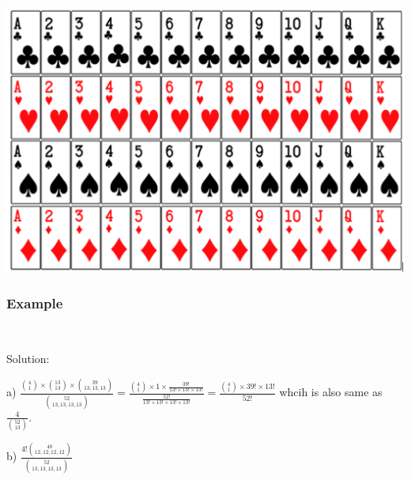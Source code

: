 \documentclass[compress]{beamer}
\begin{document}
\begin{frame}
\begin{center}
\includegraphics[scale=.4]{figs/Cards.png}
\end{center}
\end{frame}



\begin{frame}\frametitle{Example}
\\
\pause
\vspace{1in}
{\tiny 
Solution: 

a) $ \frac{   {4 \choose 1}\times  { 13 \choose 13} \times { 39 \choose {13,13,13}}    }{  {52 \choose {13,13,13,13}} }  =  \frac{   {4 \choose 1}\times  1 \times  \frac{39!}{ {13! \times 13! \times 13!}}   } {  \frac{52!}{{13!\times 13!\times 13! \times 13!}} } =   \frac{   {4 \choose 1}\times 39! \times 13! } { 52!} $ whcih is also same as $\frac{4}{{52\choose 13}} $.

b) $\frac{4! {48 \choose {12, 12, 12, 12}} }{{52 \choose {13,13,13,13}}}$
}
\vspace{2in}

\end{frame}




%
%
%
%
%
\end{document}

